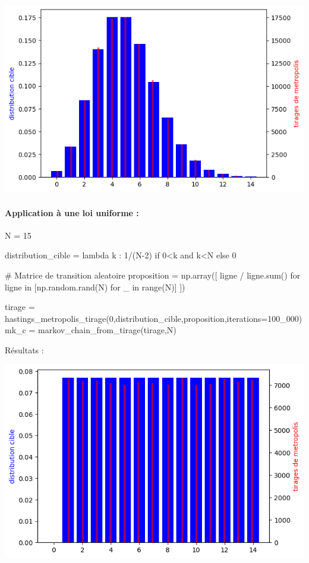 \documentclass{article}
\begin{document}
\includegraphics[scale=0.5]{poisson.png}

\newpage
\paragraph{Application à une loi uniforme :}
\begin{center}
\begin{python}
N = 15

distribution_cible = lambda k : 1/(N-2) if 0<k and k<N else 0

# Matrice de transition aleatoire
proposition = np.array([ ligne / ligne.sum()
    for ligne in [np.random.rand(N) for _ in range(N)]
])


tirage = hastings_metropolis_tirage(0,distribution_cible,proposition,iterations=100_000)
mk_c = markov_chain_from_tirage(tirage,N)
\end{python}
\end{center}
Résultats :

\includegraphics[scale=0.5]{uniforme.png}
\end{document}
